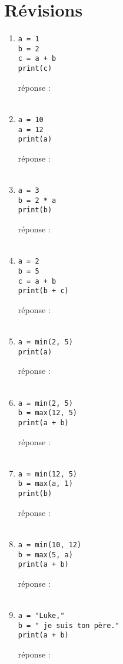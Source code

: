 \documentclass[12pt,a4paper]{article}
\newcommand{\codeintext}[1]{\texttt{#1}}
\newcommand{\response}{réponse : \hrulefill\\\\}
\begin{document}
\section*{Révisions}


\begin{enumerate}

\item
\begin{lstlisting}
a = 1
b = 2
c = a + b
print(c)
\end{lstlisting}
\response %

\item
\begin{lstlisting}
a = 10
a = 12
print(a)
\end{lstlisting}
\response %

\item
\begin{lstlisting}
a = 3
b = 2 * a
print(b)
\end{lstlisting} 
\response %

\item
\begin{lstlisting}
a = 2
b = 5
c = a + b
print(b + c)
\end{lstlisting}
\response %

\item
\begin{lstlisting}
a = min(2, 5)
print(a)
\end{lstlisting}
\response %
\pagebreak

\item
\begin{lstlisting}
a = min(2, 5)
b = max(12, 5)
print(a + b)
\end{lstlisting}
\response %

\item
\begin{lstlisting}
a = min(12, 5)
b = max(a, 1)
print(b)
\end{lstlisting}
\response %

\item
\begin{lstlisting}
a = min(10, 12)
b = max(5, a)
print(a + b)
\end{lstlisting}
\response %

\item
\begin{lstlisting}
a = "Luke,"
b = " je suis ton père."
print(a + b)
\end{lstlisting}
\response %


\end{enumerate}
\end{document}
